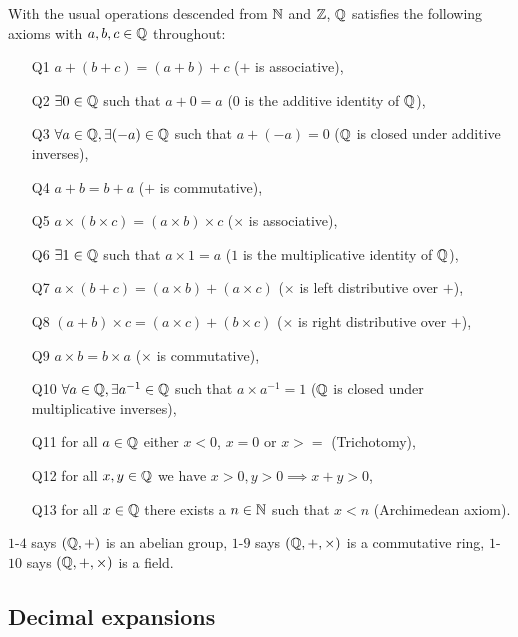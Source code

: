 \documentclass[../Year1/Year1.tex]{subfiles}
\begin{document}
\begin{theorem}
    With the usual operations descended from $\mathbb{N}$ and $\mathbb{Z}$, $\mathbb{Q}$ satisfies the following axioms with $a,b,c\in\mathbb{Q}$ throughout: \begin{enumerate}
        \item[Q1] $a+(b+c)=(a+b)+c$ ($+$ is associative),
        \item[Q2] $\exists 0\in\mathbb{Q}$ such that $a+0=a$ ($0$ is the additive identity of $\mathbb{Q}$),
        \item[Q3] $\forall a \in \mathbb{Q}, \exists (-a)\in\mathbb{Q}$ such that $a+ (-a) = 0$ ($\mathbb{Q}$ is closed under additive inverses),
        \item[Q4] $a+b = b+a$ ($+$ is commutative),\vspace{5pt}
        \item[Q5] $a\times(b\times c)=(a\times b)\times c$ ($\times$ is associative),
        \item[Q6] $\exists 1\in\mathbb{Q}$ such that $a\times1=a$ ($1$ is the multiplicative identity of $\mathbb{Q}$),
        \item[Q7] $a\times(b+c) = (a\times b) + (a\times c)$ ($\times$ is left distributive over $+$),
        \item[Q8] $(a+b)\times c = (a\times c) + (b\times c)$ ($\times$ is right distributive over $+$),
        \item[Q9] $a\times b = b\times a$ ($\times$ is commutative),\vspace{5pt}
        \item[Q10] $\forall a \in \mathbb{Q}, \exists a^{-1}\in\mathbb{Q}$ such that $a \times a^{-1} = 1$ ($\mathbb{Q}$ is closed under multiplicative inverses),\vspace{5pt}
        \item[Q11] for all $a\in\mathbb{Q}$ either $x<0$, $x=0$ or $x>=$ (Trichotomy),
        \item[Q12] for all $x,y\in\mathbb{Q}$ we have $x>0,y>0\implies x+y>0$,
        \item[Q13] for all $x\in\mathbb{Q}$ there exists a $n\in\mathbb{N}$ such that $x<n$ (Archimedean axiom).
    \end{enumerate} $1$-$4$ says $(\mathbb{Q},+)$ is an abelian group, $1$-$9$ says $(\mathbb{Q},+,\times)$ is a commutative ring, $1$-$10$ says $(\mathbb{Q},+,\times)$ is a field.
\end{theorem}

\subsection{Decimal expansions}
\end{document}
